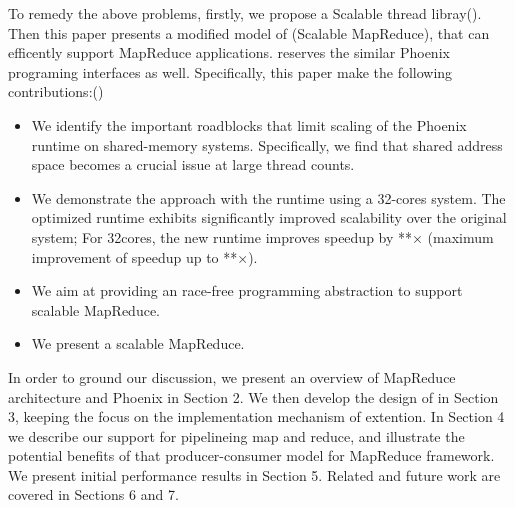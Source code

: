 To remedy the above problems, 
firstly, we propose a Scalable thread libray(\myth).
Then this paper presents a modified model of \myds(Scalable MapReduce), 
that can efficently support MapReduce applications.
\myds reserves the similar Phoenix programing interfaces as well.
Specifically, this paper make the following contributions:()
\begin{itemize}
  \item We identify the important roadblocks 
  that limit scaling of the Phoenix runtime on shared-memory systems. 
  Specifically, we find that shared address space
   becomes a crucial issue at large thread counts.

  \item We demonstrate the approach with the \myds runtime using a 32-cores system. The optimized runtime exhibits significantly improved scalability over the
original system; For 32cores, the new runtime improves speedup by **× 
(maximum improvement of speedup up to **×).

  \item We aim at providing an race-free programming abstraction to
support scalable MapReduce.
  \item We present a scalable MapReduce.
\end{itemize}

In order to ground our discussion, we present an overview
of MapReduce architecture and Phoenix in Section 2. 
We then develop the design of \myth in Section 3, 
keeping the focus on the implementation mechanism of extention. 
In Section 4 we describe our support for pipelineing map and reduce,
and illustrate the potential benefits of that producer-consumer model for MapReduce framework. 
We present initial performance results in Section 5. 
Related and future work are covered in Sections 6 and 7.

